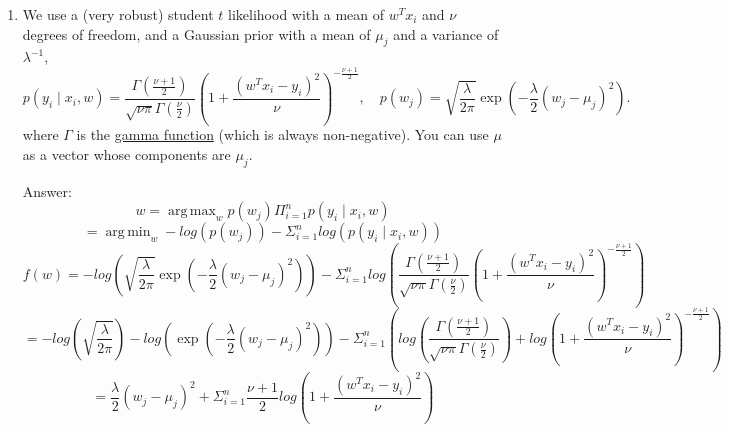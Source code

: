 \documentclass{article}
\newenvironment{answer}{\par\begingroup\color{gre}Answer: }{\endgroup}
\begin{document}
\begin{enumerate}
\begin{answer}
    \[
    w = \mathop{\mathrm{arg\,max}}_w p(w_j)\Pi^n_{i=1}p(y_i \mid x_i,w)
    \]
    \[
    = \mathop{\mathrm{arg\,min}}_w -log(p(w_j))-\Sigma^n_{i=1}log(p(y_i \mid x_i,w))
    \]
    \[
    f(w) = -log(\frac{1}{\sqrt{2\pi} \, \sigma} \exp\left(-\frac{w_j^2}{2\sigma^2} \right))-\Sigma^n_{i=1}log(\frac14 \exp\left(- \frac12 |w^Tx_i - y_i| \right)) 
    \]
    \[
    = -log(\frac{1}{\sqrt{2\pi} \, \sigma})-log( \exp\left(-\frac{w_j^2}{2\sigma^2} \right))-\Sigma^n_{i=1}log(\frac14) +log( \exp\left(- \frac12 |w^Tx_i - y_i| \right)) 
    \]
    \[
    = -log( \exp\left(-\frac{w_j^2}{2\sigma^2} \right))-\Sigma^n_{i=1}log( \exp\left(- \frac12 |w^Tx_i - y_i| \right)) 
    \]
    \[
    = \frac{w_j^2}{2\sigma^2} +\Sigma^n_{i=1} \frac12 |w^Tx_i - y_i|
    \]
    \[
    = \frac{1}{2\sigma^2}||w||^2_2+\frac12||Xw - y||_1 
    \]
\end{answer}
\newpage
 \item We use a (very robust) student $t$ likelihood with a mean of $w^Tx_i$ and $\nu$ degrees of freedom, and a Gaussian prior with a mean of $\mu_j$ and a variance of $\lambda^{-1}$,
\[
  p(y_i \mid x_i, w) = \frac{\Gamma\left(\frac{\nu + 1}{2}\right)}{\sqrt{\nu\pi}\Gamma\left(\frac \nu 2\right)}
                       \left(1 + \frac{(w^T x_i - y_i)^2}{\nu} \right)^{-\frac{\nu+1}{2}}
, \quad
  p(w_j) = \sqrt{\frac{\lambda}{2\pi}} \exp\left( -\frac\lambda2 (w_j - \mu_j)^2 \right).
\]
where $\Gamma$ is the \href{https://en.wikipedia.org/wiki/Gamma_function}{gamma function} (which is always non-negative).
You can use $\mu$ as a vector whose components are $\mu_j$.
\begin{answer}
    \[
    w = \mathop{\mathrm{arg\,max}}_w p(w_j)\Pi^n_{i=1}p(y_i \mid x_i,w)
    \]
    \[
    = \mathop{\mathrm{arg\,min}}_w -log(p(w_j))-\Sigma^n_{i=1}log(p(y_i \mid x_i,w))
    \]
    \[
    f(w) = -log(\sqrt{\frac{\lambda}{2\pi}} \exp\left( -\frac\lambda2 (w_j - \mu_j)^2 \right))-\Sigma^n_{i=1}log(\frac{\Gamma\left(\frac{\nu + 1}{2}\right)}{\sqrt{\nu\pi}\Gamma\left(\frac \nu 2\right)}\left(1 + \frac{(w^T x_i - y_i)^2}{\nu} \right)^{-\frac{\nu+1}{2}}) 
    \]
    \[
    = -log(\sqrt{\frac{\lambda}{2\pi}})-log( \exp\left( -\frac\lambda2 (w_j - \mu_j)^2 \right))-\Sigma^n_{i=1}(log(\frac{\Gamma\left(\frac{\nu + 1}{2}\right)}{\sqrt{\nu\pi}\Gamma\left(\frac \nu 2\right)})+log\left(1 + \frac{(w^T x_i - y_i)^2}{\nu} \right)^{-\frac{\nu+1}{2}}) 
    \]
    \[
    = \frac\lambda2 (w_j - \mu_j)^2 +\Sigma^n_{i=1}\frac{\nu+1}{2}log\left(1 + \frac{(w^T x_i - y_i)^2}{\nu} \right) 
\]
\end{answer}
\end{enumerate}
\end{document}
